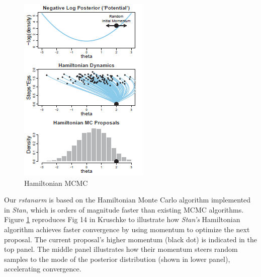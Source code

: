 \documentclass[11pt,notitlepage]{article}
\begin{document}
\begin{figure}
  \vspace{-15pt}
 \includegraphics[scale=0.85]{Figures/Hamiltonian.png}
  \vspace{-14pt}
  \caption{Hamiltonian MCMC}
    \label{fig:Hamiltonian}
 \vspace{-16 pt}
\end{figure}

Our \textit{rstanarm} is based on the Hamiltonian Monte Carlo algorithm implemented in \textit{Stan}, which is orders of magnitude faster than existing MCMC algorithms. Figure \ref{fig:Hamiltonian} reproduces Fig 14 in Kruschke \cite{Kruschke_Book_2014} to illustrate how \textit{Stan's} Hamiltonian algorithm achieves faster convergence by using momentum to optimize the next proposal. The current proposal's higher momentum (black dot) is indicated in the top panel. The middle panel illustrates how their momentum steers random samples to the mode of the posterior distribution (shown in lower panel), accelerating convergence. 
\end{document}
